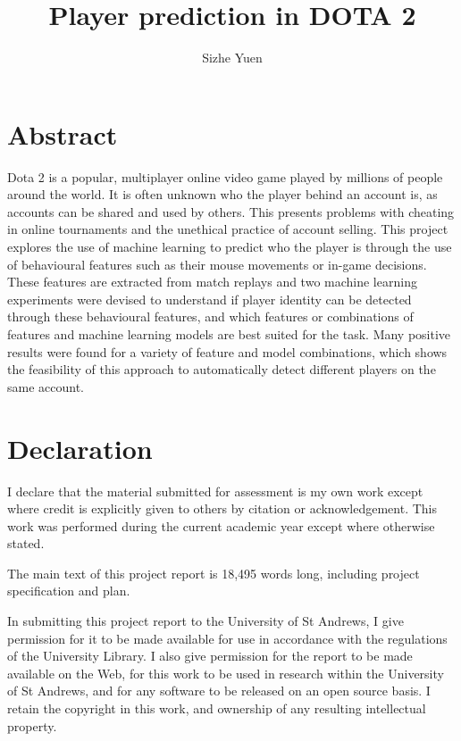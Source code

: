 \documentclass{sty/SizheArticle}
\title{Player prediction in DOTA 2}
\author{Sizhe Yuen}
\begin{document}

\newpage
{}


\section*{Abstract}
Dota 2 is a popular, multiplayer online video game played by millions of people around the world. It is often unknown who the player behind an account is, as accounts can be shared and used by others. This presents problems with cheating in online tournaments and the unethical practice of account selling. This project explores the use of machine learning to predict who the player is through the use of behavioural features such as their mouse movements or in-game decisions. These features are extracted from match replays and two machine learning experiments were devised to understand if player identity can be detected through these behavioural features, and which features or combinations of features and machine learning models are best suited for the task. Many positive results were found for a variety of feature and model combinations, which shows the feasibility of this approach to automatically detect different players on the same account. 


\section*{Declaration}
I declare that the material submitted for assessment is my own work except where credit is explicitly given to others by citation or acknowledgement. This work was performed during the current academic year except where otherwise stated.

The main text of this project report is 18,495 words long, including project specification and plan.

In submitting this project report to the University of St Andrews, I give permission for it to be made available for use in accordance with the regulations of the University Library. I also give permission for the report to be made available on the Web, for this work to be used in research within the University of St Andrews, and for any software to be released on an open source basis. I retain the copyright in this work, and ownership of any resulting intellectual property.
\end{document}
